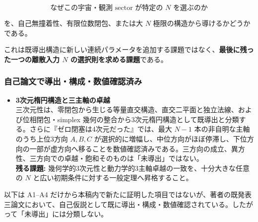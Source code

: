 \documentclass[
  a4paper,
]{ltjsarticle}
\providecommand{\tightlist}{%
  \setlength{\itemsep}{0pt}\setlength{\parskip}{0pt}}
\begin{document}
\[
\boxed{
\text{なぜこの宇宙・観測 sector が特定の }N\text{ を選ぶのか}
}
\]

を、自己無撞着性、有限位数閉包、または大 \(N\)
極限の構造から導けるかどうかである。

これは既導出構造に新しい連続パラメータを追加する課題ではなく、\textbf{最後に残った一つの離散入力
\(N\) の選択則を求める課題}である。

\subsubsection{自己論文で導出・構成・数値確認済み}\label{ux81eaux5df1ux8ad6ux6587ux3067ux5c0eux51faux69cbux6210ux6570ux5024ux78baux8a8dux6e08ux307f}

\begin{itemize}
\tightlist
\item
  \textbf{3次元楕円構造と三主軸の卓越}\\
  三次元性は、零閉包から生じる等量直交構造、直交二平面と独立法線、および位相閉包・simplex
  幾何の整合から3次元楕円構造として既導出と分類する。さらに『ゼロ閉塞は4次元だった』では、最大
  \(N-1\) 本の非自明な主軸のうち上位3方向 \(A,B,C\)
  が選択的に増幅し、中位方向がほぼ停滞し、下位方向の一部が虚方向へ移ることを数値確認済みである。三方向の成立、異方性、三方向での卓越・飽和そのものは「未導出」ではない。\\
  \textbf{残る課題:}
  幾何学的3次元性と動力学的3主軸卓越の一致を、十分大きな任意の \(N\)
  と広い初期条件に対する一般定理へ昇格すること。
\end{itemize}

以下は A1--A4
だけから本稿内で新たに証明した項目ではないが、著者の既発表三論文において、自己仮説として既に導出・構成・数値確認されている。したがって「未導出」には分類しない。
\end{document}
